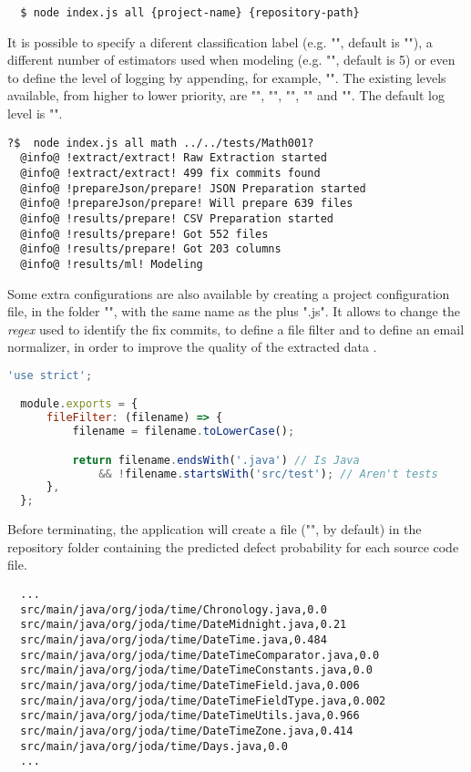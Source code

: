 \begin{lstlisting}
  $ node index.js all {project-name} {repository-path}
\end{lstlisting}

It is possible to specify a diferent classification label (e.g. "", default is ""), 
a different number of estimators used when modeling (e.g. "", default is 5) or even
to define the level of logging by appending, for example, "". The existing levels available, from higher to lower priority, are
"", "", "", "" and "". The default log level is "".

\begin{lstlisting}[style=npmlog]
  ?$  node index.js all math ../../tests/Math001?
  @info@ !extract/extract! Raw Extraction started
  @info@ !extract/extract! 499 fix commits found
  @info@ !prepareJson/prepare! JSON Preparation started
  @info@ !prepareJson/prepare! Will prepare 639 files
  @info@ !results/prepare! CSV Preparation started
  @info@ !results/prepare! Got 552 files
  @info@ !results/prepare! Got 203 columns
  @info@ !results/ml! Modeling
\end{lstlisting}

Some extra configurations are also available by creating a project configuration file, in the folder "", with the same name as the  plus ".js".
It allows to change the \emph{regex} used to identify the fix commits, to define a file filter and to define an email normalizer, in order to improve the quality of the extracted data .

\begin{lstlisting}[language=Javascript]
  'use strict';

  module.exports = {
      fileFilter: (filename) => {
          filename = filename.toLowerCase();

          return filename.endsWith('.java') // Is Java
              && !filename.startsWith('src/test'); // Aren't tests
      },
  };
\end{lstlisting}

Before terminating, the application will create a file ("", by default) in the repository folder containing the predicted defect probability for each source code file.

\begin{lstlisting}
  ...
  src/main/java/org/joda/time/Chronology.java,0.0
  src/main/java/org/joda/time/DateMidnight.java,0.21
  src/main/java/org/joda/time/DateTime.java,0.484
  src/main/java/org/joda/time/DateTimeComparator.java,0.0
  src/main/java/org/joda/time/DateTimeConstants.java,0.0
  src/main/java/org/joda/time/DateTimeField.java,0.006
  src/main/java/org/joda/time/DateTimeFieldType.java,0.002
  src/main/java/org/joda/time/DateTimeUtils.java,0.966
  src/main/java/org/joda/time/DateTimeZone.java,0.414
  src/main/java/org/joda/time/Days.java,0.0
  ...
\end{lstlisting}

